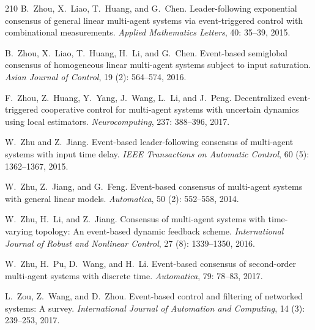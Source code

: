 \documentclass{autart}
\begin{document}
{\begin{thebibliography}{210}
B.~Zhou, X.~Liao, T.~Huang, and G.~Chen.
\newblock Leader-following exponential consensus of general linear multi-agent
  systems via event-triggered control with combinational measurements.
\newblock \emph{Applied Mathematics Letters}, 40: 35--39, 2015.

B.~Zhou, X.~Liao, T.~Huang, H.~Li, and G.~Chen.
\newblock Event-based semiglobal consensus of homogeneous linear multi-agent
  systems subject to input saturation.
\newblock \emph{Asian Journal of Control}, 19 (2): 564--574,
  2016.

F.~Zhou, Z.~Huang, Y.~Yang, J.~Wang, L.~Li, and J.~Peng.
\newblock Decentralized event-triggered cooperative control for multi-agent
  systems with uncertain dynamics using local estimators.
\newblock \emph{Neurocomputing}, 237: 388--396, 2017.

W.~Zhu and Z.~Jiang.
\newblock Event-based leader-following consensus of multi-agent systems with
  input time delay.
\newblock \emph{IEEE Transactions on Automatic Control}, 60
  (5): 1362--1367, 2015.

W.~Zhu, Z.~Jiang, and G.~Feng.
\newblock Event-based consensus of multi-agent systems with general linear
  models.
\newblock \emph{Automatica}, 50 (2): 552--558, 2014.

W.~Zhu, H.~Li, and Z.~Jiang.
\newblock Consensus of multi-agent systems with time-varying topology: An
  event-based dynamic feedback scheme.
\newblock \emph{International Journal of Robust and Nonlinear Control},
  27 (8): 1339--1350, 2016.

W.~Zhu, H.~Pu, D.~Wang, and H.~Li.
\newblock Event-based consensus of second-order multi-agent systems with
  discrete time.
\newblock \emph{Automatica}, 79: 78--83, 2017.

L.~Zou, Z.~Wang, and D.~Zhou.
\newblock Event-based control and filtering of networked systems: A survey.
\newblock \emph{International Journal of Automation and Computing}, 14
  (3): 239--253, 2017.


\end{thebibliography}}
\end{document}
